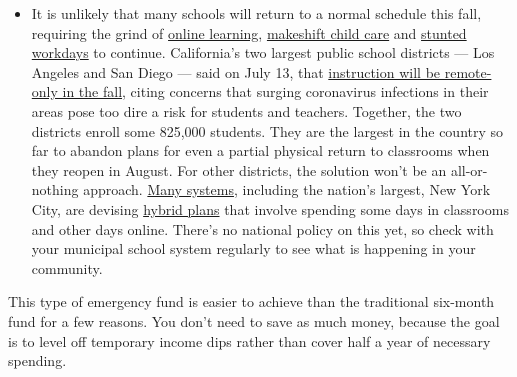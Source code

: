 \begin{itemize}
  \begin{itemize}
  \tightlist
  \item
    It is unlikely that many schools will return to a normal schedule
    this fall, requiring the grind of
    \href{https://www.nytimes3xbfgragh.onion/2020/06/05/us/coronavirus-education-lost-learning.html?action=click\&pgtype=Article\&state=default\&region=MAIN_CONTENT_3\&context=storylines_faq}{online
    learning},
    \href{https://www.nytimes3xbfgragh.onion/2020/05/29/us/coronavirus-child-care-centers.html?action=click\&pgtype=Article\&state=default\&region=MAIN_CONTENT_3\&context=storylines_faq}{makeshift
    child care} and
    \href{https://www.nytimes3xbfgragh.onion/2020/06/03/business/economy/coronavirus-working-women.html?action=click\&pgtype=Article\&state=default\&region=MAIN_CONTENT_3\&context=storylines_faq}{stunted
    workdays} to continue. California's two largest public school
    districts --- Los Angeles and San Diego --- said on July 13, that
    \href{https://www.nytimes3xbfgragh.onion/2020/07/13/us/lausd-san-diego-school-reopening.html?action=click\&pgtype=Article\&state=default\&region=MAIN_CONTENT_3\&context=storylines_faq}{instruction
    will be remote-only in the fall}, citing concerns that surging
    coronavirus infections in their areas pose too dire a risk for
    students and teachers. Together, the two districts enroll some
    825,000 students. They are the largest in the country so far to
    abandon plans for even a partial physical return to classrooms when
    they reopen in August. For other districts, the solution won't be an
    all-or-nothing approach.
    \href{https://bioethics.jhu.edu/research-and-outreach/projects/eschool-initiative/school-policy-tracker/}{Many
    systems}, including the nation's largest, New York City, are
    devising
    \href{https://www.nytimes3xbfgragh.onion/2020/06/26/us/coronavirus-schools-reopen-fall.html?action=click\&pgtype=Article\&state=default\&region=MAIN_CONTENT_3\&context=storylines_faq}{hybrid
    plans} that involve spending some days in classrooms and other days
    online. There's no national policy on this yet, so check with your
    municipal school system regularly to see what is happening in your
    community.
  \end{itemize}
\end{itemize}

This type of emergency fund is easier to achieve than the traditional
six-month fund for a few reasons. You don't need to save as much money,
because the goal is to level off temporary income dips rather than cover
half a year of necessary spending.


